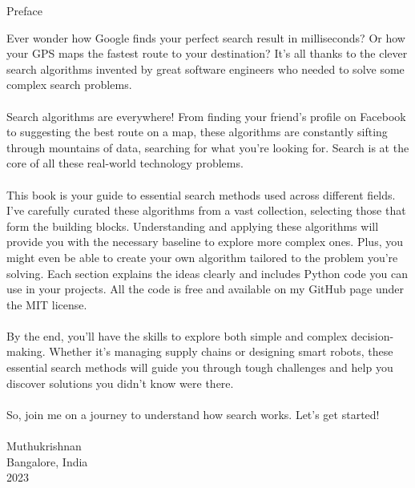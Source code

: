 \documentclass[
  letterpaper,
  paper=6in:9in,pagesize=pdftex,footinclude=on,11pt]{scrreprt}
\begin{document}
\newpage


\begin{flushleft}
\Large Preface
\end{flushleft}

\vspace*{\baselineskip}
Ever wonder how Google finds your perfect search result in milliseconds? Or how your GPS maps the fastest route to your destination? It's all thanks to the clever search algorithms invented by great software engineers who needed to solve some complex search problems.
\\
\\
Search algorithms are everywhere! From finding your friend's profile on Facebook to suggesting the best route on a map, these algorithms are constantly sifting through mountains of data, searching for what you're looking for. Search is at the core of all these real-world technology problems.
\\
\\
This book is your guide to essential search methods used across different fields. I've carefully curated these algorithms from a vast collection, selecting those that form the building blocks. Understanding and applying these algorithms will provide you with the necessary baseline to explore more complex ones. Plus, you might even be able to create your own algorithm tailored to the problem you're solving. Each section explains the ideas clearly and includes Python code you can use in your projects. All the code is free and available on my GitHub page under the MIT license.
\\
\\
By the end, you'll have the skills to explore both simple and complex decision-making. Whether it's managing supply chains or designing smart robots, these essential search methods will guide you through tough challenges and help you discover solutions you didn't know were there.
\\
\\
So, join me on a journey to understand how search works. Let's get started!
\\
\\
Muthukrishnan\\
Bangalore, India\\
2023
\newpage

\end{document}
